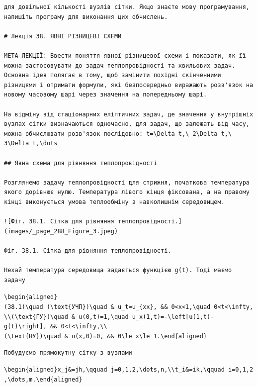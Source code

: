 \documentclass[
  ukrainian,
]{article}
\begin{document}
\begin{verbatim}
для довільної кількості вузлів сітки. Якщо знаєте мову програмування, напишіть програму для виконання цих обчислень.

# Лекція 38. ЯВНІ РІЗНИЦЕВІ СХЕМИ

МЕТА ЛЕКЦІЇ: Ввести поняття явної різницевої схеми і показати, як її можна застосовувати до задач теплопровідності та хвильових задач. Основна ідея полягає в тому, щоб замінити похідні скінченними різницями і отримати формули, які безпосередньо виражають розв'язок на новому часовому шарі через значення на попередньому шарі.

На відміну від стаціонарних еліптичних задач, де значення у внутрішніх вузлах сітки визначаються одночасно, для задач, що залежать від часу, можна обчислювати розв'язок послідовно: t=\Delta t,\ 2\Delta t,\ 3\Delta t,\dots

## Явна схема для рівняння теплопровідності

Розглянемо задачу теплопровідності для стрижня, початкова температура якого дорівнює нулю. Температура лівого кінця фіксована, а на правому кінці виконується умова теплообміну з навколишнім середовищем.

![Фіг. 38.1. Сітка для рівняння теплопровідності.](images/_page_288_Figure_3.jpeg)

Фіг. 38.1. Сітка для рівняння теплопровідності.

Нехай температура середовища задається функцією g(t). Тоді маємо задачу
\end{verbatim}

\texttt{\textbackslash{}begin\{aligned\}(38.1)\textbackslash{}quad\ (\textbackslash{}text\{УЧП\})\textbackslash{}quad\ \&\ u\_t=u\_\{xx\},\ \&\&\ 0\textless{}x\textless{}1,\textbackslash{}quad\ 0\textless{}t\textless{}\textbackslash{}infty,\textbackslash{}\textbackslash{}(\textbackslash{}text\{ГУ\})\textbackslash{}quad\ \&\ u(0,t)=1,\textbackslash{}quad\ u\_x(1,t)=-\textbackslash{}left{[}u(1,t)-g(t)\textbackslash{}right{]},\ \&\&\ 0\textless{}t\textless{}\textbackslash{}infty,\textbackslash{}\textbackslash{}(\textbackslash{}text\{НУ\})\textbackslash{}quad\ \&\ u(x,0)=0,\ \&\&\ 0\textbackslash{}le\ x\textbackslash{}le\ 1.\textbackslash{}end\{aligned\}}

\begin{verbatim}
Побудуємо прямокутну сітку з вузлами
\end{verbatim}

\texttt{\textbackslash{}begin\{aligned\}x\_j\&=jh,\textbackslash{}qquad\ j=0,1,2,\textbackslash{}dots,n,\textbackslash{}\textbackslash{}t\_i\&=ik,\textbackslash{}qquad\ i=0,1,2,\textbackslash{}dots,m.\textbackslash{}end\{aligned\}}
\end{document}
